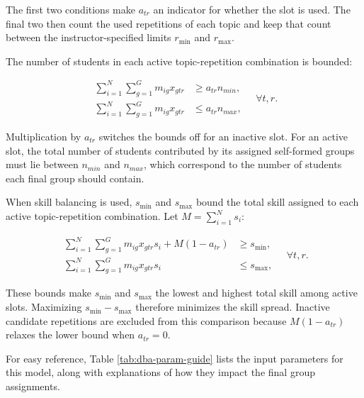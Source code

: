 The first two conditions make \(a_{tr}\) an indicator for whether the slot is
used. The final two then count the used repetitions of each topic and keep that
count between the instructor-specified limits \(r_{\min}\) and \(r_{\max}\).

The number of students in each active topic-repetition combination is bounded:

\[
\begin{aligned}
\sum_{i=1}^{N}\sum_{g=1}^{G}m_{ig}x_{gtr}
&\geq a_{tr}n_{min},\\
\sum_{i=1}^{N}\sum_{g=1}^{G}m_{ig}x_{gtr}
&\leq a_{tr}n_{max},
\end{aligned}
\quad \forall t,r. \tag{4}
\]

Multiplication by \(a_{tr}\) switches the bounds off for an inactive slot. For
an active slot, the total number of students contributed by its assigned
self-formed groups must lie between \(n_{min}\) and \(n_{max}\), which
correspond to the number of students each final group should contain.

When skill balancing is used, \(s_{\min}\) and \(s_{\max}\) bound the total
skill assigned to each active topic-repetition combination. Let
\(M=\sum_{i=1}^{N}s_i\):

\[
\begin{aligned}
\sum_{i=1}^{N}\sum_{g=1}^{G}m_{ig}x_{gtr}s_i+M(1-a_{tr})&\geq s_{\min},\\
\sum_{i=1}^{N}\sum_{g=1}^{G}m_{ig}x_{gtr}s_i&\leq s_{\max},
\end{aligned}
\quad \forall t,r. \tag{5}
\]

These bounds make \(s_{\min}\) and \(s_{\max}\) the lowest and highest total
skill among active slots. Maximizing \(s_{\min}-s_{\max}\) therefore minimizes
the skill spread. Inactive candidate repetitions are excluded from this
comparison because \(M(1-a_{tr})\) relaxes the lower bound when \(a_{tr}=0\).

For easy reference, Table \ref{tab:dba-param-guide} lists the input parameters
for this model, along with explanations of how they impact the final group
assignments.

